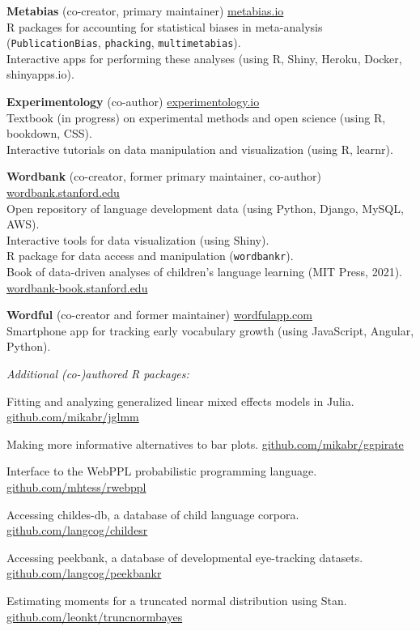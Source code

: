 \documentclass[11pt,]{article}
\newcommand{\project}[4]{
  \textbf{#1} #3 \hfill \small \href{http://#2}{#2} \normalsize \\ \hangindent=15pt #4
}
\newcommand{\plab}[1]{
  \footnotesize \texttt{#1} \normalsize
}
\newcommand{\pinl}[1]{\footnotesize\texttt{#1}\normalsize}
\newcommand{\hlink}[1]{
  \hfill \small \href{http://#1}{#1} \normalsize
}
\begin{document}
\project{Metabias}{metabias.io}{(co-creator, primary maintainer)}{R packages for accounting for statistical biases in meta-analysis (\pinl{PublicationBias}, \pinl{phacking}, \pinl{multimetabias}).\\ Interactive apps for performing these analyses (using R, Shiny, Heroku, Docker, shinyapps.io).}

\project{Experimentology}{experimentology.io}{(co-author)}{Textbook (in progress) on experimental methods and open science (using R, bookdown, CSS).\\ Interactive tutorials on data manipulation and visualization (using R, learnr).}

\project{Wordbank}{wordbank.stanford.edu}{(co-creator, former primary maintainer, co-author)}{Open repository of language development data (using Python, Django, MySQL, AWS).\\ Interactive tools for data visualization (using Shiny).\\ R package for data access and manipulation (\pinl{wordbankr}).\\ Book of data-driven analyses of children's language learning (MIT Press, 2021). \hlink{wordbank-book.stanford.edu}}

\project{Wordful}{wordfulapp.com}{(co-creator and former maintainer)}{Smartphone app for tracking early vocabulary growth (using JavaScript, Angular, Python).}

\emph{Additional (co-)authored R packages:}

\begin{description}[leftmargin=!,labelwidth=\widthof{\plab{truncnormbayes}}]

  \item[\plab{jglmm}] Fitting and analyzing generalized linear mixed effects models in Julia. \hlink{github.com/mikabr/jglmm}

  \item[\plab{ggpirate}] Making more informative alternatives to bar plots. \hlink{github.com/mikabr/ggpirate}

  \item[\plab{rwebppl}] Interface to the WebPPL probabilistic programming language. \hlink{github.com/mhtess/rwebppl}

  \item[\plab{childesr}] Accessing childes-db, a database of child language corpora. \hlink{github.com/langcog/childesr}


  \item[\plab{peekbankr}] Accessing peekbank, a database of developmental eye-tracking datasets. \hlink{github.com/langcog/peekbankr}

  \item[\plab{truncnormbayes}] Estimating moments for a truncated normal distribution using Stan. \hlink{github.com/leonkt/truncnormbayes}

\end{description}
\end{document}
